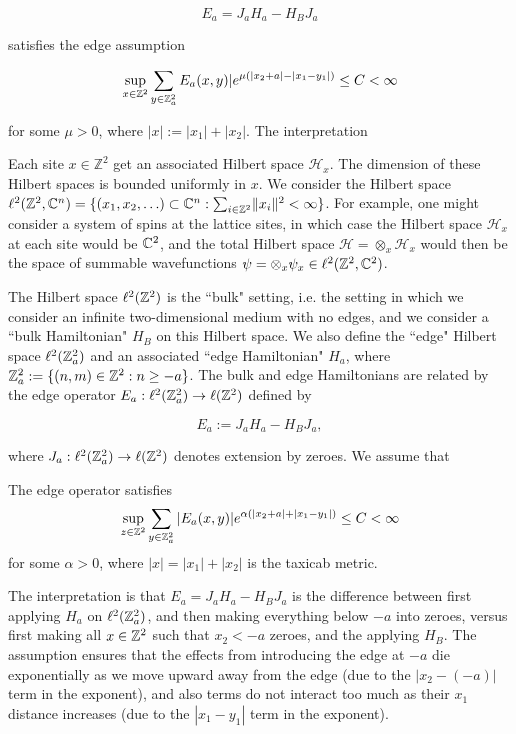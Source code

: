 \documentclass[12pt, letterpaper]{article}
\begin{document}
\[E_a = J_aH_a-H_BJ_a\]

satisfies the edge assumption

\[\sup_{x\in\mathbb{Z}^2}\sum_{y\in\mathbb{Z}^2_a} E_a(x,y)|e^{\mu(|x_2+a|-|x_1-y_1|)} \leq C < \infty\]

for some $\mu>0$, where $|x| := |x_1|+|x_2|$. The interpretation





Each site $x \in \mathbb{Z}^2$ get an associated Hilbert space $\mathcal{H}_x$. The dimension of these Hilbert spaces is bounded uniformly in $x$. We consider the Hilbert space $\ell^2(\mathbb{Z}^2, \mathbb{C}^n) = \{ (x_1,x_2,\ldots) \subset \mathbb{C}^n : \sum_{i \in \mathbb{Z}^2} \lVert x_i \rVert^2 < \infty\}$. For example, one might consider a system of spins at the lattice sites, in which case the Hilbert space $\mathcal{H}_x$ at each site would be $\mathbb{C}^2$, and the total Hilbert space $\mathcal{H} = \otimes_x \mathcal{H}_x$ would then be the space of summable wavefunctions $\psi = \otimes_x\psi_x \in \ell^2(\mathbb{Z}^2,\mathbb{C}^2)$.

The Hilbert space $\ell^2(\mathbb{Z}^2)$ is the ``bulk" setting, i.e. the setting in which we consider an infinite two-dimensional medium with no edges, and we consider a ``bulk Hamiltonian" $H_B$ on this Hilbert space. We also define the ``edge" Hilbert space $\ell^2(\mathbb{Z}_a^2)$ and an associated ``edge Hamiltonian" $H_a$, where $\mathbb{Z}^2_a := \{(n,m) \in \mathbb{Z}^2 : n \geq -a\}$. The bulk and edge Hamiltonians are related by the edge operator $E_a : \ell^2(\mathbb{Z}^2_a) \to \ell(\mathbb{Z}^2)$ defined by

\[E_a := J_aH_a - H_BJ_a,\]

where $J_a : \ell^2(\mathbb{Z}_a^2) \to \ell(\mathbb{Z}^2)$ denotes extension by zeroes. We assume that

\begin{assumption}
The edge operator satisfies
\[\sup_{z\in\mathbb{Z}^2}\sum_{y\in\mathbb{Z}^2_a} |E_a(x,y)| e^{\alpha(|x_2 + a| + |x_1-y_1|)} \leq C < \infty\]
for some $\alpha>0$, where $|x| = |x_1|+|x_2|$ is the taxicab metric.
\label{ass:edge}
\end{assumption}



The interpretation is that $E_a = J_aH_a - H_BJ_a$ is the difference between first applying $H_a$ on $\ell^2(\mathbb{Z}^2_a)$, and then making everything below $-a$ into zeroes, versus first making all $x \in \mathbb{Z}^2$ such that $x_2 < -a$ zeroes, and the applying $H_B$. The assumption ensures that the effects from introducing the edge at $-a$ die exponentially as we move upward away from the edge (due to the $|x_2 - (-a)|$ term in the exponent), and also terms do not interact too much as their $x_1$ distance increases (due to the $|x_1-y_1|$ term in the exponent).
\end{document}
